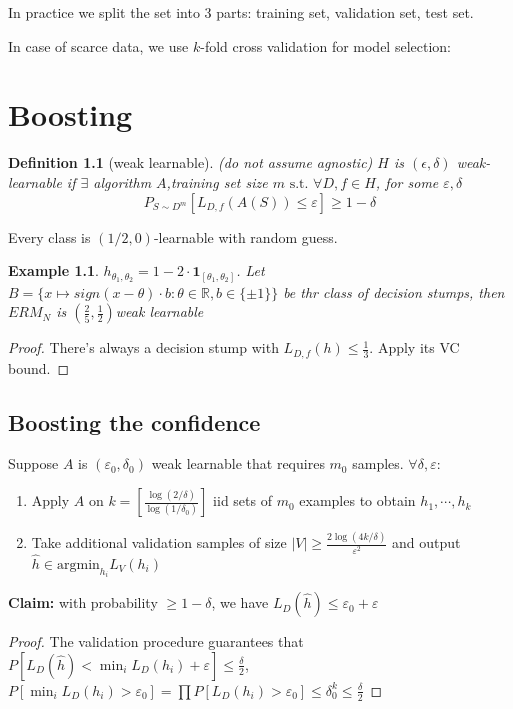 \documentclass{book}
\newcommand{\R}{\mathbb{R}}
\newcommand{\st}{\text{ s.t. }}
\newtheorem{Def}{Definition}[section]
\newtheorem{Eg}{Example}[section]
\begin{document}
In practice we split the set into 3 parts: training set, validation set, test set.

In case of scarce data, we use $k$-fold cross validation for model selection:

\chapter{Boosting}
\begin{Def}[weak learnable]
  (do not assume agnostic) $H$ is $(\epsilon,\delta)$ weak-learnable if $\exists $ algorithm $A$,training set size $m\st\forall D,f\in H$, for some $\varepsilon,\delta$
  \[P_{S\sim D^{m}}[L_{D,f}(A(S))\leq \varepsilon]\geq 1-\delta\]
\end{Def}

Every class is $(1/2,0)$-learnable with random guess.

\begin{Eg}
  $h_{\theta_{1},\theta_{2}}=1-2\cdot \bm{1}_{[\theta_{1},\theta_{2}]}$. Let $B=\{x\mapsto sign(x-\theta)\cdot b:\theta\in\R, b\in\{\pm 1\}\}$ be thr class of decision stumps, then $ERM_{N}$ is $(\frac{2}{5},\frac{1}{2})$weak learnable
\end{Eg}
\begin{proof}
  There's always a decision stump with $L_{D,f}(h)\leq \frac{1}{3}$. Apply its VC bound.
\end{proof}

\section{Boosting the confidence}
Suppose $A$ is $(\varepsilon_{0},\delta_{0})$ weak learnable that requires $m_{0}$ samples. $\forall\delta,\varepsilon:$
\begin{enumerate}
\item Apply $A$ on $k=[\frac{\log(2/\delta)}{\log(1/\delta_{0})}]$ iid sets of $m_{0}$ examples to obtain $h_{1},\cdots,h_{k}$
\item Take additional validation samples of size $|V|\geq \frac{2\log(4k/\delta)}{\varepsilon^{2}}$ and output $\hat h\in\mathrm{argmin}_{h_{i}}L_{V}(h_{i})$
\end{enumerate}
\textbf{Claim:} with probability $\geq 1-\delta$, we have $L_{D}(\hat h)\leq \varepsilon_{0}+\varepsilon$
\begin{proof}
  The validation procedure guarantees that $P[L_{D}(\hat h)<\min_{i}L_{D}(h_{i})+{\varepsilon}]\leq\frac{\delta}{2}$, $P[\min_{i}L_{D}(h_{i})>\varepsilon_{0}]=\prod P[L_{D}(h_{i})>\varepsilon_{0}]\leq \delta_{0}^{k}\leq\frac{\delta}{2}$
\end{proof}
\end{document}

